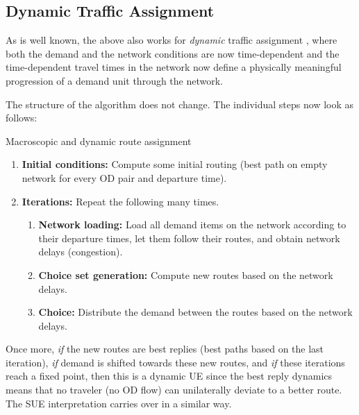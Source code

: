 \subsection{Dynamic Traffic Assignment}

As is well known, the above also works for \emph{dynamic} traffic
assignment \citep[DTA; see][]{peeta-2001}, where both the demand and the 
network conditions are now time-dependent and the time-dependent travel 
times in the network now define a physically meaningful progression of 
a demand unit through the network. 

The structure of the algorithm does not change. The individual steps now look as follows:
\begin{algorithm}[H]
\label{dynamic-macro-routes}

\caption{Macroscopic and dynamic route assignment}

\begin{enumerate}

\item \textbf{Initial conditions:} Compute some initial routing (\eg best path on empty network
  for every OD pair and departure time).

\item \textbf{Iterations:} Repeat the following many times.

\begin{enumerate}

\item \textbf{Network loading:} Load all demand items on the network
  according to their departure times, let them follow their
  routes, and obtain network delays (congestion).

\item \textbf{Choice set generation:} Compute new routes based on the
  network delays.

\item \textbf{Choice:} Distribute the demand between the routes based
  on the network delays.

\end{enumerate} %

\end{enumerate}

\end{algorithm}

Once more, \emph{if} the new routes are best replies (\ie best paths
based on the last iteration), \emph{if} demand is shifted towards
these new routes, and \emph{if} these iterations reach a fixed point,
then this is a dynamic UE since the best reply dynamics means that no
traveler (no OD flow) can unilaterally deviate to a better route.  The
SUE interpretation carries over in a similar way.

